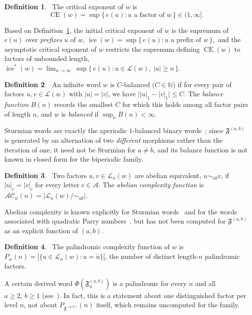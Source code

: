 \documentclass[12pt]{amsart}
\theoremstyle{plain}
\theoremstyle{definition}
\newtheorem{definition}{Definition}
\theoremstyle{remark}
\newcommand{\CE}{\operatorname{CE}}
\newcommand{\ice}{\operatorname{ice}}
\newcommand{\aice}{\operatorname{ice}^*}
\newcommand{\N}{\mathbb{N}}
\newcommand{\AlphA}{\mathcal{A}}
\newcommand{\FD}{\mathfrak{F}}
\begin{document}
\begin{definition}~\label{def01ce}
The critical exponent of $w$ is
\[
  \CE(w) = \sup\{\, e(u) : u \text{ a factor of } w \,\} \in (1,\infty].
\]
\end{definition}
Based on Definition~\ref{def01ce}, the initial critical exponent of $w$ is the supremum of $e(u)$
over \emph{prefixes} $u$ of $w$, $\ice(w) = \sup\{\, e(u) : u \text{ a prefix of } w\,\},$
and the asymptotic critical exponent of $w$ restricts the
supremum defining $\CE(w)$ to factors of unbounded length, $\aice(w) = \lim_{n\to\infty}\ \sup\{\, e(u) : u \in \mathcal{L}(w),\ |u|\geqslant n \,\}.$
\begin{definition}~\label{def01balance}
An infinite word $w$ is $C$-balanced ($C\in\N$) if for every pair
of factors $u,v\in\mathcal{L}(w)$ with $|u|=|v|$, we have
$\bigl||u|_1-|v|_1\bigr|\le C$. The \emph{balance function} $B(n)$
records the smallest $C$ for which this holds among all factor pairs of
length $n$, and $w$ is \emph{balanced} if $\sup_n B(n)<\infty$.
\end{definition}

Sturmian words are exactly the aperiodic $1$-balanced binary
words~\cite{MorseHedlund1940}; since $\FD^{(a,b)}$ is generated by an
alternation of two \emph{different} morphisms rather than the iteration
of one, it need not be Sturmian for $a\ne b$, and its balance function
is not known in closed form for the biperiodic family.

\begin{definition}~\label{def01abelian}
Two factors $u,v\in\mathcal{L}_n(w)$ are abelian equivalent,
$u\sim_{ab}v$, if $|u|_c=|v|_c$ for every letter $c\in\AlphA$. The
\emph{abelian complexity function} is
$\mathcal{AC}_w(n)=|\mathcal{L}_n(w)/\!\sim_{ab}|$.
\end{definition}

Abelian complexity is known explicitly for Sturmian
words~\cite{RichommeSaariZamboni2010} and for the words associated with
quadratic Parry numbers~\cite{BalkovaBrindaTurek2011}, but has not been
computed for $\FD^{(a,b)}$ as an explicit function of $(a,b)$.

\begin{definition}~\label{def01palcomplexity}
The palindromic complexity function of $w$ is
$P_w(n)=|\{u\in\mathcal{L}_n(w): u=\widetilde u\}|$, the number of
distinct length-$n$ palindromic factors.
\end{definition}

A certain derived word
$\Phi(\FD^{(a,b)}_n)$ is a palindrome for every $n$ and all $a\geqslant 2,\,
b\geqslant 1$ (see~\cite{Ramirez2015}). In fact, this is a statement about one distinguished
factor per level $n$, not about $P_{\FD^{(a,b)}}(n)$ itself, which remains
uncomputed for the family.
\end{document}
